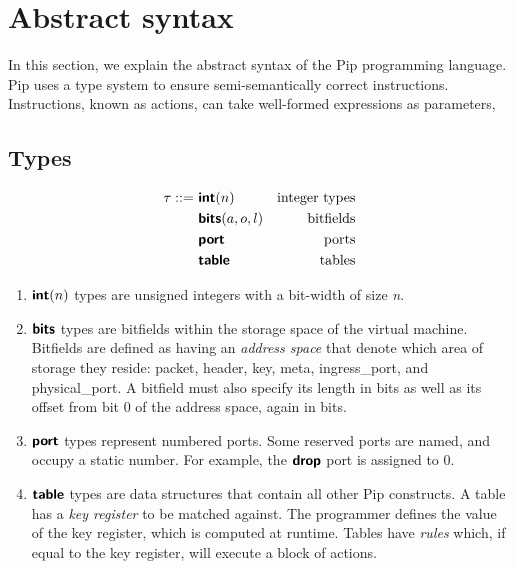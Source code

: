 
\section{Abstract syntax}
In this section, we explain the abstract syntax of the Pip programming
language. 
Pip uses a type system to ensure semi-semantically correct instructions. Instructions, known as actions, can take well-formed expressions as parameters, 

\subsection{Types}

\begin{align*}
\tau ::=~& \bm{\mathsf{{int}}}(n)        & \text{integer types} \\
         & \bm{\mathsf{{bits}}}(a, o, l) & \text{bitfields} \\
         & \bm{\mathsf{{port}}}          & \text{ports} \\
         & \bm{\mathsf{{table}}}         & \text{tables} \\
\end{align*}

\begin{enumerate}
\item $\bm{\mathsf{{int}}}(n)$ types are unsigned integers with a bit-width of size \textit{n}.
\item $\bm{\mathsf{{bits}}}$ types are bitfields within the storage space of the virtual machine. Bitfields are defined as having an \textit{address space} that denote which area of storage they reside: packet, header, key, meta, ingress\_port, and physical\_port. A bitfield must also specify its length in bits as well as its offset from bit 0 of the address space, again in bits.
\item $\bm{\mathsf{{port}}}$ types represent numbered ports. Some reserved ports are named, and occupy a static number. For example, the $\bm{\mathsf{{drop}}}$ port is assigned to 0.
\item $\bm{\mathsf{{table}}}$ types are data structures that contain all other Pip constructs. A table has a \textit{key register} to be matched against. The programmer defines the value of the key register, which is computed at runtime. Tables have \textit{rules} which, if equal to the key register, will execute a block of actions.
\end{enumerate}

